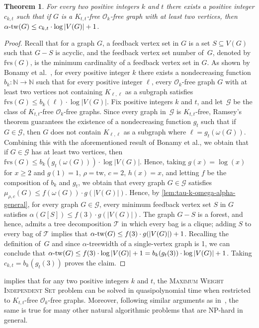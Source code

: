 \documentclass[11pt]{article}
\newcommand{\tw}{\mathrm{tw}}
\newcommand{\fvs}{\mathrm{fvs}}
\newcommand{\tin}{\alpha \textnormal{-} \tw}
\newcommand{\rhocm}{\mu_{\rho,c}}
\theoremstyle{plain}
\newtheorem{theorem}{Theorem}[section]
\theoremstyle{definition}
\theoremstyle{remark}
\numberwithin{equation}{section}
\begin{document}
\begin{theorem}\label{thm:OK-free}
For every two positive integers $k$ and $t$ there exists a positive integer $c_{k,t}$ such that if $G$ is a $K_{t,t}$-free $\mathcal{O}_k$-free graph with at least two vertices, then $\tin(G)\le c_{k,t}\cdot \log |V(G)|+1$.
\end{theorem}

\begin{proof}
Recall that for a graph $G$, a feedback vertex set in $G$ is a set $S\subseteq V(G)$ such that $G-S$ is acyclic, and the feedback vertex set number of~$G$, denoted by $\fvs(G)$, is the minimum cardinality of a feedback vertex set in $G$.
As shown by Bonamy et al.~\cite{MR4723425}, for every positive integer $k$ there exists a nondecreasing function $b_k \colon \mathbb{N} \rightarrow \mathbb{N}$ such that for every positive integer $\ell$, every $\mathcal{O}_k$-free graph $G$ with at least two vertices not containing $K_{\ell,\ell}$ as a subgraph satisfies $\fvs(G)\le b_k(\ell)\cdot \log |V(G)|$.
Fix positive integers $k$ and $t$, and let~$\mathcal{G}$ be the class of $K_{t,t}$-free $\mathcal{O}_k$-free graphs.
Since every graph in~$\mathcal{G}$ is $K_{t,t}$-free, Ramsey's theorem guarantees the existence of a nondecreasing function $g_t$ such that if $G\in \mathcal{G}$, then $G$ does not contain $K_{\ell,\ell}$ as a subgraph where $\ell = g_t(\omega(G))$.
Combining this with the aforementioned result of Bonamy et al., we obtain that if $G\in  \mathcal{G}$ has at least two vertices, then $\fvs(G)\le b_k(g_t(\omega(G)))\cdot \log |V(G)|$.
Hence, taking $g(x)=\log(x)$ for $x \geq 2$ and $g(1) = 1$, $\rho=\tw$, $c = 2$, $h(x) = x$, and letting $f$ be the composition of $b_k$ and $g_t$, we obtain that every graph $G\in \mathcal{G}$ satisfies $\rhocm(G)\le f(\omega(G))\cdot g(|V(G)|)$.
Hence, by \cref{lem:tau-k-omega-alpha-general},  for every graph $G\in \mathcal{G}$, every minimum feedback vertex set $S$ in $G$  satisfies $\alpha(G[S])\le f(3)\cdot g(|V(G)|)$.
The graph $G-S$ is a forest, and hence, admits a tree decomposition $\mathcal T$ in which every bag is a clique; adding $S$ to every bag of $\mathcal T$ implies that $\tin(G) \le f(3)\cdot g(|V(G)|)+1$. 
Recalling the definition of~$G$ and since $\alpha$-treewidth of a single-vertex graph is 1, we can conclude that $\tin(G)\le f(3)\cdot \log |V(G)| + 1 = b_k(g_t(3))\cdot \log |V(G)| + 1$. Taking $c_{k,t} = b_k(g_t(3))$ proves the claim.
\end{proof}

 implies that for any two positive integers $k$ and $t$, the \textsc{Maximum Weight Independent Set} problem can be solved in quasipolynomial time when restricted to $K_{t,t}$-free $\mathcal{O}_k$-free graphs.
Moreover, following similar arguments as in~\cite{MR4955546,chudnovsky2025treeindependencenumberivsoda}, the same is true for many other natural algorithmic problems that are \textsf{NP}-hard in general.
 
\end{document}
